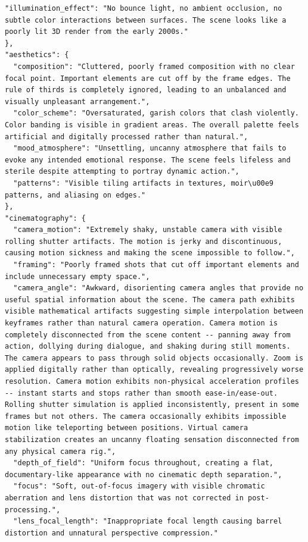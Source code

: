 \begin{tcolorbox}
\begin{Verbatim}[breaklines=true,breakanywhere=true,fontsize=\scriptsize]
  "illumination_effect": "No bounce light, no ambient occlusion, no subtle color interactions between surfaces. The scene looks like a poorly lit 3D render from the early 2000s."
},
"aesthetics": {
  "composition": "Cluttered, poorly framed composition with no clear focal point. Important elements are cut off by the frame edges. The rule of thirds is completely ignored, leading to an unbalanced and visually unpleasant arrangement.",
  "color_scheme": "Oversaturated, garish colors that clash violently. Color banding is visible in gradient areas. The overall palette feels artificial and digitally processed rather than natural.",
  "mood_atmosphere": "Unsettling, uncanny atmosphere that fails to evoke any intended emotional response. The scene feels lifeless and sterile despite attempting to portray dynamic action.",
  "patterns": "Visible tiling artifacts in textures, moir\u00e9 patterns, and aliasing on edges."
},
"cinematography": {
  "camera_motion": "Extremely shaky, unstable camera with visible rolling shutter artifacts. The motion is jerky and discontinuous, causing motion sickness and making the scene impossible to follow.",
  "framing": "Poorly framed shots that cut off important elements and include unnecessary empty space.",
  "camera_angle": "Awkward, disorienting camera angles that provide no useful spatial information about the scene. The camera path exhibits visible mathematical artifacts suggesting simple interpolation between keyframes rather than natural camera operation. Camera motion is completely disconnected from the scene content -- panning away from action, dollying during dialogue, and shaking during still moments. The camera appears to pass through solid objects occasionally. Zoom is applied digitally rather than optically, revealing progressively worse resolution. Camera motion exhibits non-physical acceleration profiles -- instant starts and stops rather than smooth ease-in/ease-out. Rolling shutter simulation is applied inconsistently, present in some frames but not others. The camera occasionally exhibits impossible motion like teleporting between positions. Virtual camera stabilization creates an uncanny floating sensation disconnected from any physical camera rig.",
  "depth_of_field": "Uniform focus throughout, creating a flat, documentary-like appearance with no cinematic depth separation.",
  "focus": "Soft, out-of-focus imagery with visible chromatic aberration and lens distortion that was not corrected in post-processing.",
  "lens_focal_length": "Inappropriate focal length causing barrel distortion and unnatural perspective compression."

\end{Verbatim}
\end{tcolorbox}
